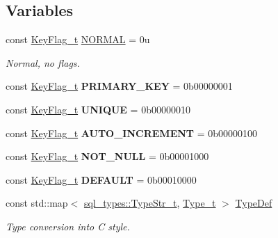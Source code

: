 \subsection*{Variables}
\begin{DoxyCompactItemize}
\item 
\mbox{\label{namespacesf_a50b38ab4427343bee97887908a3fb1c8}} 
const \hyperlink{namespacesf_ab38d6ab0cbacec81e7d09c0d53feb958}{Key\+Flag\+\_\+t} \hyperlink{namespacesf_a50b38ab4427343bee97887908a3fb1c8}{N\+O\+R\+M\+AL} = 0u
\begin{DoxyCompactList}\small\item\em Normal, no flags. \end{DoxyCompactList}\item 
\mbox{\label{namespacesf_ae3923b5979f4b5e302eabb199e7b8e88}} 
const \hyperlink{namespacesf_ab38d6ab0cbacec81e7d09c0d53feb958}{Key\+Flag\+\_\+t} {\bfseries P\+R\+I\+M\+A\+R\+Y\+\_\+\+K\+EY} = 0b00000001
\item 
\mbox{\label{namespacesf_acc336fe66c2ccbf55da0fa87dfd3800e}} 
const \hyperlink{namespacesf_ab38d6ab0cbacec81e7d09c0d53feb958}{Key\+Flag\+\_\+t} {\bfseries U\+N\+I\+Q\+UE} = 0b00000010
\item 
\mbox{\label{namespacesf_a764109715552c4ed622ce5e1b13fe0e1}} 
const \hyperlink{namespacesf_ab38d6ab0cbacec81e7d09c0d53feb958}{Key\+Flag\+\_\+t} {\bfseries A\+U\+T\+O\+\_\+\+I\+N\+C\+R\+E\+M\+E\+NT} = 0b00000100
\item 
\mbox{\label{namespacesf_a7f47b34eda2fcc2cc1c900419f39b0f0}} 
const \hyperlink{namespacesf_ab38d6ab0cbacec81e7d09c0d53feb958}{Key\+Flag\+\_\+t} {\bfseries N\+O\+T\+\_\+\+N\+U\+LL} = 0b00001000
\item 
\mbox{\label{namespacesf_a4e727b242178ef48270d2cd5754ed94b}} 
const \hyperlink{namespacesf_ab38d6ab0cbacec81e7d09c0d53feb958}{Key\+Flag\+\_\+t} {\bfseries D\+E\+F\+A\+U\+LT} = 0b00010000
\item 
const std\+::map$<$ \hyperlink{namespacesf_1_1sql__types_a1a4f114cdf79706d2298e3454006e65b}{sql\+\_\+types\+::\+Type\+Str\+\_\+t}, \hyperlink{namespacesf_aee849ddcdbf3bdb22d912e4ab0c7b93f}{Type\+\_\+t} $>$ \hyperlink{namespacesf_a58f57ec57dddbf6be7dcdbca38e1524f}{Type\+Def}
\begin{DoxyCompactList}\small\item\em Type conversion into C style. \end{DoxyCompactList}\end{DoxyCompactItemize}


